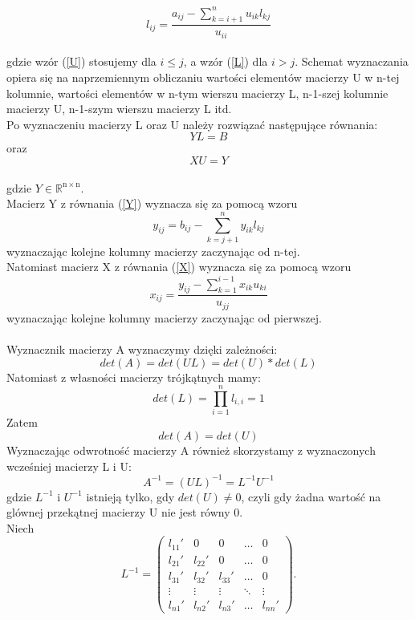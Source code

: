 \documentclass[12pt]{article}
\begin{document}
\begin{equation}
l_{ij}=\dfrac{a_{ij}-\sum_{k=i+1}^n u_{ik}l_{kj}}{u_{ii}} \label{L}
\end{equation}
\\
gdzie wz\'or (\ref{U}) stosujemy dla $i \leq j$, a wz\'or (\ref{L}) dla $i > j$.
Schemat wyznaczania opiera si\k{e} na naprzemiennym obliczaniu warto\'sci element\'ow macierzy U w n-tej kolumnie, warto\'sci element\'ow w n-tym wierszu macierzy L, n-1-szej kolumnie macierzy U, n-1-szym wierszu macierzy L itd.
\\
Po wyznaczeniu macierzy L oraz U nale\.zy rozwi\k{a}za\'c nast\k{e}puj\k{a}ce r\'ownania:
\begin{equation}
YL=B \label{Y}
\end{equation}
oraz
\begin{equation}
XU=Y \label{X}
\end{equation}
\\
gdzie $Y\in \mathbb R^\mathrm{n\times n}$. 
\\
Macierz Y z r\'ownania (\ref{Y}) wyznacza si\k{e} za pomoc\k{a} wzoru
\[
y_{ij}=b_{ij}-\sum_{k=j+1}^n y_{ik}l_{kj} 
\]
wyznaczaj\k{a}c kolejne kolumny macierzy zaczynaj\k{a}c od n-tej. 
\\
 Natomiast macierz X z r\'ownania (\ref{X}) wyznacza si\k{e} za pomoc\k{a} wzoru
 \[
 x_{ij}=\frac{y_{ij}-\sum_{k=1}^{i-1} x_{ik}u_{ki}}{u_{jj}}
 \]
 wyznaczaj\k{a}c kolejne kolumny macierzy zaczynaj\k{a}c od pierwszej. 
\\
\\
Wyznacznik macierzy A wyznaczymy dzi\k{e}ki zale\.zno\'sci:
\[
det(A)=det(UL)=det(U)*det(L)
\]
Natomiast z w\l{}asno\'sci macierzy tr\'ojk\k{a}tnych mamy:
\[
det(L)=\prod_{i=1}^n l_{i,i}=1
\]
Zatem 
\[
det(A)=det(U)
\]
Wyznaczaj\k{a}c odwrotno\'s\'c macierzy A r\'ownie\.z skorzystamy z wyznaczonych wcze\'sniej macierzy L i U:
\[
A^{-1}=(UL)^{-1}=L^{-1}U^{-1}
\]
gdzie $L^{-1}$ i $U^{-1}$ istniej\k{a} tylko, gdy $det(U)\neq 0$, czyli gdy \.zadna warto\'s\'c na gl\'ownej przek\k{a}tnej macierzy U nie jest r\'owny 0.
\\
Niech 
\[
L^{-1}=\begin{pmatrix}
l_{11}' & 0 & 0 & \ldots & 0 \\
l_{21}' & l_{22}' & 0 & \ldots & 0 \\
l_{31}' & l_{32}' & l_{33}' & \ldots & 0 \\
\vdots & \vdots & \vdots & \ddots & \vdots \\
l_{n1}' & l_{n2}' & l_{n3}' & \ldots & l_{nn}'
\end{pmatrix}.
\]
\end{document}
